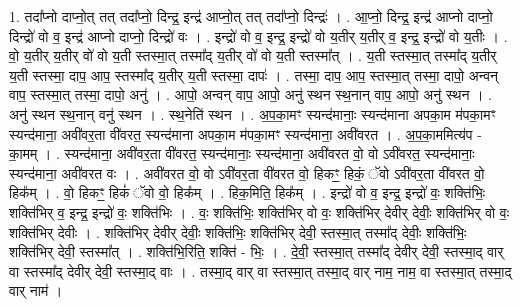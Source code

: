 \documentclass[17pt]{extarticle}
\begin{document}
1. तदा᳚प्नो दाप्नो॒त् तत् तदा᳚प्नो॒ दिन्द्र॒ इन्द्र॑ आप्नो॒त् तत् तदा᳚प्नो॒ दिन्द्रः॑ । . आ॒प्नो॒ दिन्द्र॒ इन्द्र॑ आप्नो दाप्नो॒ दिन्द्रो॑ वो व॒ इन्द्र॑ आप्नो दाप्नो॒ दिन्द्रो॑ वः । . इन्द्रो॑ वो व॒ इन्द्र॒ इन्द्रो॑ वो य॒तीर् य॒तीर् व॒ इन्द्र॒ इन्द्रो॑ वो य॒तीः । . वो॒ य॒तीर् य॒तीर् वो॑ वो य॒ती स्तस्मा॒त् तस्मा᳚द् य॒तीर् वो॑ वो य॒ती स्तस्मा᳚त् । . य॒ती स्तस्मा॒त् तस्मा᳚द् य॒तीर् य॒ती स्तस्मा॒ दाप॒ आप॒ स्तस्मा᳚द् य॒तीर् य॒ती स्तस्मा॒ दापः॑ । . तस्मा॒ दाप॒ आप॒ स्तस्मा॒त् तस्मा॒ दापो॒ अन्वन् वाप॒ स्तस्मा॒त् तस्मा॒ दापो॒ अनु॑ । . आपो॒ अन्वन् वाप॒ आपो॒ अनु॑ स्थन स्थ॒नान् वाप॒ आपो॒ अनु॑ स्थन । . अनु॑ स्थन स्थ॒नान् वनु॑ स्थन । . स्थ॒नेति॑ स्थन । . अ॒प॒का॒मꣳ स्यन्द॑मानाः॒ स्यन्द॑माना अपका॒म म॑पका॒मꣳ स्यन्द॑माना॒ अवी॑वर॒ता वी॑वरत॒ स्यन्द॑माना अपका॒म म॑पका॒मꣳ स्यन्द॑माना॒ अवी॑वरत । . अ॒प॒का॒ममित्य॑प - का॒मम् । . स्यन्द॑माना॒ अवी॑वर॒ता वी॑वरत॒ स्यन्द॑मानाः॒ स्यन्द॑माना॒ अवी॑वरत वो॒ वो ऽवी॑वरत॒ स्यन्द॑मानाः॒ स्यन्द॑माना॒ अवी॑वरत वः । . अवी॑वरत वो॒ वो ऽवी॑वर॒ता वी॑वरत वो॒ हिकꣳ॒॒ हिकं॒ ॅवो ऽवी॑वर॒ता वी॑वरत वो॒ हिक᳚म् । . वो॒ हिकꣳ॒॒ हिकं॑ ॅवो वो॒ हिक᳚म् । . हिक॒मिति॒ हिक᳚म् । . इन्द्रो॑ वो व॒ इन्द्र॒ इन्द्रो॑ वः॒ शक्ति॑भिः॒ शक्ति॑भिर् व॒ इन्द्र॒ इन्द्रो॑ वः॒ शक्ति॑भिः । . वः॒ शक्ति॑भिः॒ शक्ति॑भिर् वो वः॒ शक्ति॑भिर् देवीर् देवीः॒ शक्ति॑भिर् वो वः॒ शक्ति॑भिर् देवीः । . शक्ति॑भिर् देवीर् देवीः॒ शक्ति॑भिः॒ शक्ति॑भिर् देवी॒ स्तस्मा॒त् तस्मा᳚द् देवीः॒ शक्ति॑भिः॒ शक्ति॑भिर् देवी॒ स्तस्मा᳚त् । . शक्ति॑भि॒रिति॒ शक्ति॑ - भिः॒ । . दे॒वी॒ स्तस्मा॒त् तस्मा᳚द् देवीर् देवी॒ स्तस्मा॒द् वार् वा स्तस्मा᳚द् देवीर् देवी॒ स्तस्मा॒द् वाः । . तस्मा॒द् वार् वा स्तस्मा॒त् तस्मा॒द् वार् नाम॒ नाम॒ वा स्तस्मा॒त् तस्मा॒द् वार् नाम॑ । \newline
\end{document}
